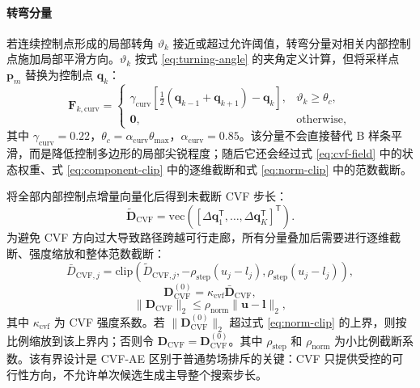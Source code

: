 \paragraph{转弯分量}
若连续控制点形成的局部转角 $\vartheta_k$ 接近或超过允许阈值，转弯分量对相关内部控制点施加局部平滑方向。$\vartheta_k$ 按式 \eqref{eq:turning-angle} 的夹角定义计算，但将采样点 $\mathbf p_m$ 替换为控制点 $\mathbf q_k$：
\begin{equation}
    \mathbf{F}_{k,\mathrm{curv}}=
    \begin{cases}
    \gamma_{\mathrm{curv}}
    \left[\tfrac{1}{2}(\mathbf{q}_{k-1}+\mathbf{q}_{k+1})-\mathbf{q}_k\right],
    & \vartheta_k\geq \theta_c,\\[4pt]
    \mathbf 0,
    & \mathrm{otherwise},
    \end{cases}
    \label{eq:curvature-field}
\end{equation}
其中 $\gamma_{\mathrm{curv}}=0.22$，$\theta_c=\alpha_{\mathrm{curv}}\theta_{\max}$，$\alpha_{\mathrm{curv}}=0.85$。该分量不会直接替代 B 样条平滑，而是降低控制多边形的局部尖锐程度；随后它还会经过式 \eqref{eq:cvf-field} 中的状态权重、式 \eqref{eq:component-clip} 中的逐维截断和式 \eqref{eq:norm-clip} 中的范数截断。

将全部内部控制点增量向量化后得到未截断 CVF 步长：
\begin{equation}
    \widetilde{\mathbf D}_{\mathrm{CVF}}=
    \mathrm{vec}
    \left(
    [\Delta\mathbf q_1^\mathsf{T},\ldots,\Delta\mathbf q_K^\mathsf{T}]^\mathsf{T}
    \right).
    \label{eq:cvf-vectorization}
\end{equation}
为避免 CVF 方向过大导致路径跨越可行走廊，所有分量叠加后需要进行逐维截断、强度缩放和整体范数截断：
\begin{equation}
    \bar D_{\mathrm{CVF},j}=
    \mathrm{clip}
    \left(
    \widetilde D_{\mathrm{CVF},j},
    -\rho_{\mathrm{step}}(u_j-l_j),
    \rho_{\mathrm{step}}(u_j-l_j)
    \right),
    \label{eq:component-clip}
\end{equation}
\begin{equation}
    \mathbf D_{\mathrm{CVF}}^{(0)}=
    \kappa_{\mathrm{cvf}}\bar{\mathbf D}_{\mathrm{CVF}},
    \label{eq:cvf-strength}
\end{equation}
\begin{equation}
    \|\mathbf{D}_{\mathrm{CVF}}\|_2
    \leq
    \rho_{\mathrm{norm}}\|\mathbf{u}-\mathbf{l}\|_2 ,
    \label{eq:norm-clip}
\end{equation}
其中 $\kappa_{\mathrm{cvf}}$ 为 CVF 强度系数。若 $\|\mathbf D_{\mathrm{CVF}}^{(0)}\|_2$ 超过式 \eqref{eq:norm-clip} 的上界，则按比例缩放到该上界内；否则令 $\mathbf D_{\mathrm{CVF}}=\mathbf D_{\mathrm{CVF}}^{(0)}$。其中 $\rho_{\mathrm{step}}$ 和 $\rho_{\mathrm{norm}}$ 为小比例截断系数。该有界设计是 CVF-AE 区别于普通势场排斥的关键：CVF 只提供受控的可行性方向，不允许单次候选生成主导整个搜索步长。

